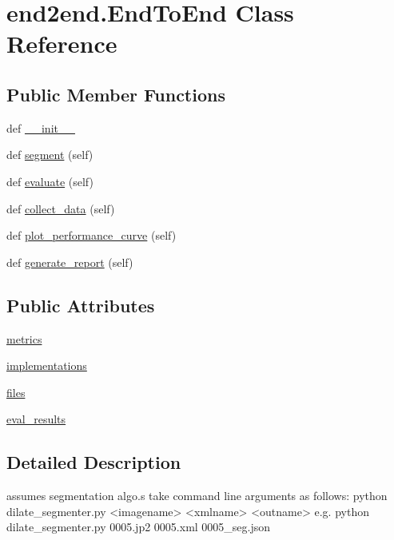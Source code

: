 \hypertarget{classend2end_1_1_end_to_end}{}\section{end2end.\+End\+To\+End Class Reference}
\label{classend2end_1_1_end_to_end}
\subsection*{Public Member Functions}
\begin{DoxyCompactItemize}
\item 
def \hyperlink{classend2end_1_1_end_to_end_a3ce7258a07bc39f8ba9d64c66728d4bd}{\+\_\+\+\_\+init\+\_\+\+\_\+}
\item 
def \hyperlink{classend2end_1_1_end_to_end_a57f639d39e2efecb9860206de6fb047f}{segment} (self)
\item 
def \hyperlink{classend2end_1_1_end_to_end_a2669806e0452bdd84167a7a93e712431}{evaluate} (self)
\item 
def \hyperlink{classend2end_1_1_end_to_end_acda84165d4549e6666ea77525b857db4}{collect\+\_\+data} (self)
\item 
def \hyperlink{classend2end_1_1_end_to_end_a4bbb3f8fc4702c949839e2150d95c9cd}{plot\+\_\+performance\+\_\+curve} (self)
\item 
def \hyperlink{classend2end_1_1_end_to_end_ad595e2dfc993e0078023e4ccdbdd2162}{generate\+\_\+report} (self)
\end{DoxyCompactItemize}
\subsection*{Public Attributes}
\begin{DoxyCompactItemize}
\item 
\hyperlink{classend2end_1_1_end_to_end_aaa7b9811ffa4d76a9c373081f8049054}{metrics}
\item 
\hyperlink{classend2end_1_1_end_to_end_a12ace31b33007ce1e018e6894d9a58e5}{implementations}
\item 
\hyperlink{classend2end_1_1_end_to_end_ae0b4bfb16ba1d157ac70571f843a5f0a}{files}
\item 
\hyperlink{classend2end_1_1_end_to_end_a988f3dac007b1c7c997d5bb1288e972d}{eval\+\_\+results}
\end{DoxyCompactItemize}


\subsection{Detailed Description}
\begin{DoxyVerb}assumes segmentation algo.s take command line arguments as follows:
     python dilate_segmenter.py <imagename> <xmlname> <outname>
  e.g.
     python dilate_segmenter.py 0005.jp2 0005.xml 0005_seg.json
\end{DoxyVerb}
 

